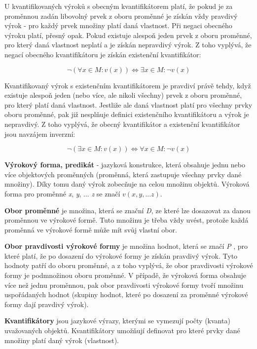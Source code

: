 U kvantifikovaných výroků s obecným kvantifikátorem platí, že pokud je za proměnnou zadán libovolný prvek z oboru proměnné je získán vždy pravdivý výrok - pro každý prvek množiny platí daná vlastnost. Při negaci obecného výroku platí, přesný opak. Pokud existuje alespoň jeden prvek z oboru proměnné, pro který daná vlastnost neplatí a je získán nepravdivý výrok. Z toho vyplývá, že negací obecného kvantifikátoru je získán existenční kvantifikátor:

$$ \neg(\forall x \in M: v(x)) \Leftrightarrow \exists x \in M : \neg v(x)  $$


Kvantifikovaný výrok s existenčním kvantifikátorem je pravdiví právě tehdy, když existuje alespoň jeden (nebo více, ale nikoli všechny) prvek z oboru proměnné, pro který platí daná vlastnost. Jestliže ale daná vlastnost platí pro všechny prvky oboru proměnné, pak již nesplňuje definici existenčního kvantifikátoru a výrok je nepravdivý. Z toho vyplývá, že obecný kvantifikátor a existenční kvantifikátor jsou navzájem inverzní:

$$\neg (\exists x \in M: v(x)) \Leftrightarrow \forall x \in M: \neg v(x) $$


{\bf Výrokový forma, predikát} - jazyková konstrukce, která obsahuje jednu nebo více objektových proměnných (proměnná, která zastupuje všechny prvky dané množiny). Díky tomu daný výrok zobecňuje na celou množinu objektů. Výroková forma pro proměnné {\it x}, {\it y}, ... {\it z} se značí $v(x,y, ... z)$.

{\bf Obor proměnné} je množina, která se znační {\it D}, ze které lze dosazovat za danou proměnnou ve výrokové formě. Tuto množinu je třeba vždy uvést, protože každá proměnná ve výrokové formě může mít svůj vlastní obor.

{\bf Obor pravdivosti výrokové formy} je množina hodnot, která se značí {\it P }, pro které platí, že po dosazení do výrokové formy je získán pravdivý výrok. Tyto hodnoty patří do oboru proměnné, a z toho vyplývá, že obor pravdivosti výrokové formy je podmnožinou oboru proměnné. V případě, že výroková forma obsahuje více než jednu proměnnou, pak obor pravdivosti výrokové formy tvoří množinu uspořádaných hodnot (skupiny hodnot, které po dosazení za proměnné výrokové formy dají pravdivý výrok).

{\bf Kvantifikátory} jsou jazykové výrazy, kterými se vymezují počty (kvanta) uvažovaných objektů. Kvantifikátory umožňují definovat pro které prvky dané množiny platí daný výrok (vlastnost). 

